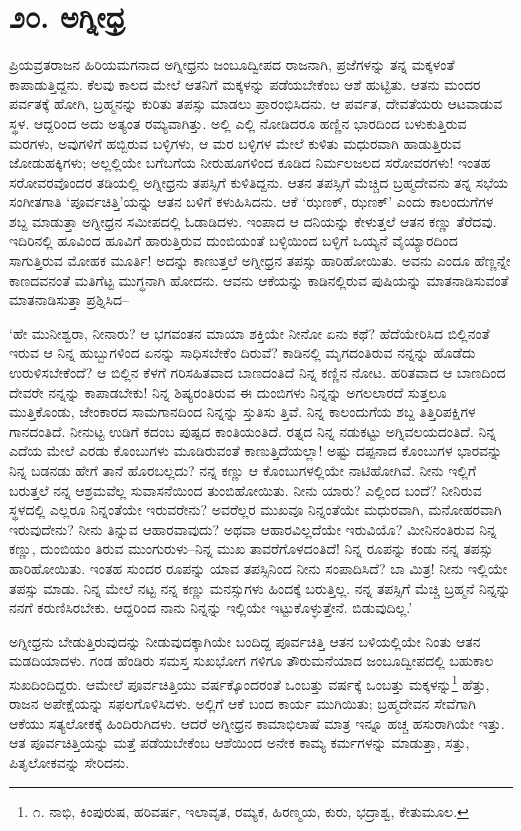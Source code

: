 
\chapter{೨೦. ಅಗ್ನೀಧ್ರ}

ಪ್ರಿಯವ್ರತರಾಜನ ಹಿರಿಯಮಗನಾದ ಅಗ್ನೀಧ್ರನು ಜಂಬೂದ್ವೀಪದ ರಾಜನಾಗಿ, ಪ್ರಜೆಗಳನ್ನು ತನ್ನ ಮಕ್ಕಳಂತೆ ಕಾಪಾಡುತ್ತಿದ್ದನು. ಕೆಲವು ಕಾಲದ ಮೇಲೆ ಆತನಿಗೆ ಮಕ್ಕಳನ್ನು ಪಡೆಯಬೇಕೆಂಬ ಆಶೆ ಹುಟ್ಟಿತು. ಆತನು ಮಂದರ ಪರ್ವತಕ್ಕೆ ಹೋಗಿ, ಬ್ರಹ್ಮನನ್ನು ಕುರಿತು ತಪಸ್ಸು ಮಾಡಲು ಪ್ರಾರಂಭಿಸಿದನು. ಆ ಪರ್ವತ, ದೇವತೆಯರು ಆಟವಾಡುವ ಸ್ಥಳ. ಆದ್ದರಿಂದ ಅದು ಅತ್ಯಂತ ರಮ್ಯವಾಗಿತ್ತು. ಅಲ್ಲಿ ಎಲ್ಲಿ ನೋಡಿದರೂ ಹಣ್ಣಿನ ಭಾರದಿಂದ ಬಳುಕುತ್ತಿರುವ ಮರಗಳು, ಅವುಗಳಿಗೆ ಹಬ್ಬಿರುವ ಬಳ್ಳಿಗಳು, ಆ ಮರ ಬಳ್ಳಿಗಳ ಮೇಲೆ ಕುಳಿತು ಮಧುರವಾಗಿ ಹಾಡುತ್ತಿರುವ ಜೋಡುಹಕ್ಕಿಗಳು; ಅಲ್ಲಲ್ಲಿಯೇ ಬಗೆಬಗೆಯ ನೀರುಹೂಗಳಿಂದ ಕೂಡಿದ ನಿರ್ಮಲಜಲದ ಸರೋವರಗಳು! ಇಂತಹ ಸರೋವರವೊಂದರ ತಡಿಯಲ್ಲಿ ಅಗ್ನೀಧ್ರನು ತಪಸ್ಸಿಗೆ ಕುಳಿತಿದ್ದನು. ಆತನ ತಪಸ್ಸಿಗೆ ಮೆಚ್ಚಿದ ಬ್ರಹ್ಮದೇವನು ತನ್ನ ಸಭೆಯ ಸಂಗೀತಗಾತಿ ‘ಪೂರ್ವಚಿತ್ತಿ’ಯನ್ನು ಆತನ ಬಳಿಗೆ ಕಳುಹಿಸಿದನು. ಆಕೆ ‘ಝಣಕ್, ಝಣಕ್​’ ಎಂದು ಕಾಲಂದುಗೆಗಳ ಶಬ್ದ ಮಾಡುತ್ತಾ ಅಗ್ನೀಧ್ರನ ಸಮೀಪದಲ್ಲಿ ಓಡಾಡಿದಳು. ಇಂಪಾದ ಆ ದನಿಯನ್ನು ಕೇಳುತ್ತಲೆ ಆತನ ಕಣ್ಣು ತೆರೆದವು. ಇದಿರಿನಲ್ಲಿ ಹೂವಿಂದ ಹೂವಿಗೆ ಹಾರುತ್ತಿರುವ ದುಂಬಿಯಂತೆ ಬಳ್ಳಿಯಿಂದ ಬಳ್ಳಿಗೆ ಒಯ್ಯನೆ ವೈಯ್ಯಾರದಿಂದ ಸಾಗುತ್ತಿರುವ ಮೋಹಕ ಮೂರ್ತಿ! ಅದನ್ನು ಕಾಣುತ್ತಲೆ ಅಗ್ನೀಧ್ರನ ತಪಸ್ಸು ಹಾರಿಹೋಯಿತು. ಅವನು ಎಂದೂ ಹೆಣ್ಣನ್ನೇ ಕಾಣದವನಂತೆ ಮತಿಗೆಟ್ಟ ಮುಗ್ಧನಾಗಿ ಹೋದನು. ಆವನು ಆಕೆಯನ್ನು ಕಾಡಿನಲ್ಲಿರುವ ಪುಷಿಯನ್ನು ಮಾತನಾಡಿಸುವಂತೆ ಮಾತನಾಡಿಸುತ್ತಾ ಪ್ರಶ್ನಿಸಿದ–

‘ಹೇ ಮುನೀಶ್ವರಾ, ನೀನಾರು? ಆ ಭಗವಂತನ ಮಾಯಾ ಶಕ್ತಿಯೇ ನೀನೋ ಏನು ಕಥೆ? ಹೆದೆಯೇರಿಸಿದ ಬಿಲ್ಲಿನಂತೆ ಇರುವ ಆ ನಿನ್ನ ಹುಬ್ಬುಗಳಿಂದ ಏನನ್ನು ಸಾಧಿಸಬೇಕೆಂ ದಿರುವೆ? ಕಾಡಿನಲ್ಲಿ ಮೃಗದಂತಿರುವ ನನ್ನನ್ನು ಹೊಡೆದು ಉರುಳಿಸಬೇಕೆಂದೆ? ಆ ಬಿಲ್ಲಿನ ಕೆಳಗೆ ಗರಿಸಹಿತವಾದ ಬಾಣದಂತಿದೆ ನಿನ್ನ ಕಣ್ಣಿನ ನೋಟ. ಹರಿತವಾದ ಆ ಬಾಣದಿಂದ ದೇವರೇ ನನ್ನನ್ನು ಕಾಪಾಡಬೇಕು! ನಿನ್ನ ಶಿಷ್ಯರಂತಿರುವ ಈ ದುಂಬಿಗಳು ನಿನ್ನನ್ನು ಅಗಲಲಾರದೆ ಸುತ್ತಲೂ ಮುತ್ತಿಕೊಂಡು, ಜೇಂಕಾರದ ಸಾಮಗಾನದಿಂದ ನಿನ್ನನ್ನು ಸ್ತುತಿಸು ತ್ತಿವೆ. ನಿನ್ನ ಕಾಲಂದುಗೆಯ ಶಬ್ದ ತಿತ್ತಿರಿಪಕ್ಷಿಗಳ ಗಾನದಂತಿದೆ. ನೀನುಟ್ಟ ಉಡಿಗೆ ಕದಂಬ ಪುಷ್ಪದ ಕಾಂತಿಯಂತಿದೆ. ರತ್ನದ ನಿನ್ನ ನಡುಕಟ್ಟು ಅಗ್ನಿವಲಯದಂತಿದೆ. ನಿನ್ನ ಎದೆಯ ಮೇಲೆ ಎರಡು ಕೊಂಬುಗಳು ಮೂಡಿರುವಂತೆ ಕಾಣುತ್ತಿದೆಯಲ್ಲಾ! ಅಷ್ಟು ದಪ್ಪನಾದ ಕೊಂಬುಗಳ ಭಾರವನ್ನು ನಿನ್ನ ಬಡನಡು ಹೇಗೆ ತಾನೆ ಹೊರಬಲ್ಲದು? ನನ್ನ ಕಣ್ಣು ಆ ಕೊಂಬುಗಳಲ್ಲಿಯೇ ನಾಟಿಹೋಗಿವೆ. ನೀನು ಇಲ್ಲಿಗೆ ಬರುತ್ತಲೆ ನನ್ನ ಆಶ್ರಮವೆಲ್ಲ ಸುವಾಸನೆಯಿಂದ ತುಂಬಿಹೋಯಿತು. ನೀನು ಯಾರು? ಎಲ್ಲಿಂದ ಬಂದೆ? ನೀನಿರುವ ಸ್ಥಳದಲ್ಲಿ ಎಲ್ಲರೂ ನಿನ್ನಂತೆಯೇ ಇರುವರೇನು? ಅವರೆಲ್ಲರ ಮುಖವೂ ನಿನ್ನಂತೆಯೇ ಮಧುರವಾಗಿ, ಮನೋಹರವಾಗಿ ಇರುವುದೇನು? ನೀನು ತಿನ್ನುವ ಆಹಾರವಾವುದು? ಅಥವಾ ಆಹಾರವಿಲ್ಲದೆಯೇ ಇರುವಿಯೊ? ಮೀನಿನಂತಿರುವ ನಿನ್ನ ಕಣ್ಣು, ದುಂಬಿಯಂ ತಿರುವ ಮುಂಗುರುಳು–ನಿನ್ನ ಮುಖ ತಾವರೆಗೊಳದಂತಿದೆ! ನಿನ್ನ ರೂಪನ್ನು ಕಂಡು ನನ್ನ ತಪಸ್ಸು ಹಾರಿಹೋಯಿತು. ಇಂತಹ ಸುಂದರ ರೂಪನ್ನು ಯಾವ ತಪಸ್ಸಿನಿಂದ ನೀನು ಸಂಪಾದಿಸಿದೆ? ಬಾ ಮಿತ್ರ! ನೀನು ಇಲ್ಲಿಯೇ ತಪಸ್ಸು ಮಾಡು. ನಿನ್ನ ಮೇಲೆ ನಟ್ಟ ನನ್ನ ಕಣ್ಣು ಮನಸ್ಸುಗಳು ಹಿಂದಕ್ಕೆ ಬರುತ್ತಿಲ್ಲ. ನನ್ನ ತಪಸ್ಸಿಗೆ ಮೆಚ್ಚಿ ಬ್ರಹ್ಮನೆ ನಿನ್ನನ್ನು ನನಗೆ ಕರುಣಿಸಿರಬೇಕು. ಆದ್ದರಿಂದ ನಾನು ನಿನ್ನನ್ನು ಇಲ್ಲಿಯೇ ಇಟ್ಟುಕೊಳ್ಳುತ್ತೇನೆ. ಬಿಡುವುದಿಲ್ಲ.’

ಅಗ್ನೀಧ್ರನು ಬೇಡುತ್ತಿರುವುದನ್ನು ನೀಡುವುದಕ್ಕಾಗಿಯೇ ಬಂದಿದ್ದ ಪೂರ್ವಚಿತ್ತಿ ಆತನ ಬಳಿಯಲ್ಲಿಯೇ ನಿಂತು ಆತನ ಮಡದಿಯಾದಳು. ಗಂಡ ಹೆಂಡಿರು ಸಮಸ್ತ ಸುಖಭೋಗ ಗಳಿಗೂ ತೌರುಮನೆಯಾದ ಜಂಬೂದ್ವೀಪದಲ್ಲಿ ಬಹುಕಾಲ ಸುಖದಿಂದಿದ್ದರು. ಆಮೇಲೆ ಪೂರ್ವಚಿತ್ತಿಯು ವರ್ಷಕ್ಕೊಂದರಂತೆ ಒಂಬತ್ತು ವರ್ಷಕ್ಕೆ ಒಂಬತ್ತು ಮಕ್ಕಳನ್ನು\footnote{೧. ನಾಭಿ, ಕಿಂಪುರುಷ, ಹರಿವರ್ಷ, ಇಲಾವೃತ, ರಮ್ಯಕ, ಹಿರಣ್ಮಯ, ಕುರು, ಭದ್ರಾಶ್ವ, ಕೇತುಮೂಲ.} ಹೆತ್ತು, ರಾಜನ ಅಪೇಕ್ಷೆಯನ್ನು ಸಫಲಗೊಳಿಸಿದಳು. ಅಲ್ಲಿಗೆ ಆಕೆ ಬಂದ ಕಾರ್ಯ ಮುಗಿಯಿತು; ಬ್ರಹ್ಮದೇವನ ಸೇವೆಗಾಗಿ ಆಕೆಯು ಸತ್ಯಲೋಕಕ್ಕೆ ಹಿಂದಿರುಗಿದಳು. ಆದರೆ ಅಗ್ನೀಧ್ರನ ಕಾಮಾಭಿಲಾಷೆ ಮಾತ್ರ ಇನ್ನೂ ಹಚ್ಚ ಹಸುರಾಗಿಯೇ ಇತ್ತು. ಆತ ಪೂರ್ವಚಿತ್ತಿಯನ್ನು ಮತ್ತೆ ಪಡೆಯಬೇಕೆಂಬ ಆಶೆಯಿಂದ ಅನೇಕ ಕಾಮ್ಯ ಕರ್ಮಗಳನ್ನು ಮಾಡುತ್ತಾ, ಸತ್ತು, ಪಿತೃಲೋಕವನ್ನು ಸೇರಿದನು.

